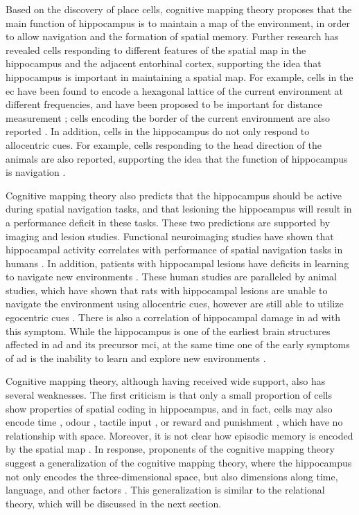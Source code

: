 Based on the discovery of place cells, cognitive mapping theory proposes that the main function of hippocampus is to maintain a map of the environment, in order to allow navigation and the formation of spatial memory. Further research has revealed cells responding to different features of the spatial map in the hippocampus and the adjacent entorhinal cortex, supporting the idea that hippocampus is important in maintaining a spatial map. For example, cells in the \gls{ec} have been found to encode a hexagonal lattice of the current environment at different frequencies, and have been proposed to be important for distance measurement \citep{fyhn04, hafting05, moser15}; cells encoding the border of the current environment are also reported \citep{solstad08}. In addition, cells in the hippocampus do not only respond to allocentric cues. For example, cells responding to the head direction of the animals are also reported, supporting the idea that the function of hippocampus is navigation \citep{sargolini06}. 

Cognitive mapping theory also predicts that the hippocampus should be active during spatial navigation tasks, and that lesioning the hippocampus will result in a performance deficit in these tasks. These two predictions are supported by imaging and lesion studies. Functional neuroimaging studies have shown that hippocampal activity correlates with performance of spatial navigation tasks in humans \citep{burgess02, hartley07}. In addition, patients with hippocampal lesions have deficits in learning to navigate new environments \citep{hartley07}. These human studies are paralleled by animal studies, which have shown that rats with hippocampal lesions are unable to navigate the environment using allocentric cues, however are still able to utilize egocentric cues \citep{morris06}. There is also a correlation of hippocampal damage in \gls{ad} with this symptom. While the hippocampus is one of the earliest brain structures affected in  \gls{ad} and its precursor \gls{mci}, at the same time one of the early symptoms of \gls{ad} is the inability to learn and explore new environments \citep{vlcek14}.

Cognitive mapping theory, although having received wide support, also has several weaknesses. The first criticism is that only a small proportion of cells show properties of spatial coding in hippocampus, and in fact, cells may also encode time \citep{hampson93}, odour \citep{wood99}, tactile input \citep{young94}, or reward and punishment \citep{moser08}, which have no relationship with space. Moreover, it is not clear how episodic memory is encoded by the spatial map \citep{konkel09}. In response, proponents of the cognitive mapping theory suggest a generalization of the cognitive mapping theory, where the hippocampus not only encodes the three-dimensional space, but also dimensions along time, language, and other factors \citep{burgess02}. This generalization is similar to the relational theory, which will be discussed in the next section.

